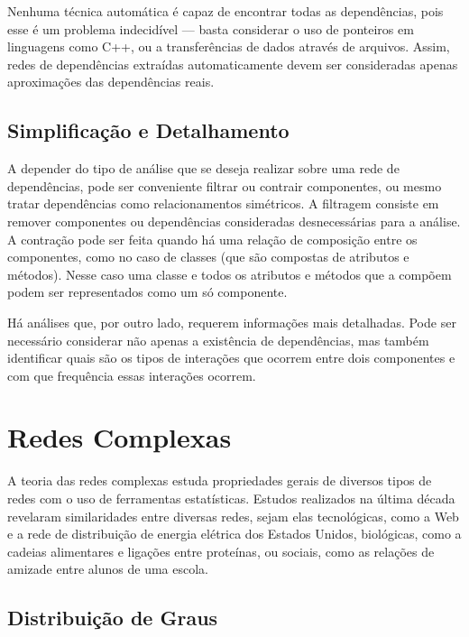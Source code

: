 \documentclass{article}
\begin{document}
Nenhuma técnica automática é capaz de encontrar todas as dependências, pois esse é um problema indecidível \cite{Landi1992} --- basta considerar o uso de ponteiros em linguagens como C++, ou a transferências de dados através de arquivos. Assim, redes de dependências extraídas automaticamente devem ser consideradas apenas aproximações das dependências reais.

\subsection{Simplificação e Detalhamento}

A depender do tipo de análise que se deseja realizar sobre uma rede de dependências, pode ser conveniente filtrar ou contrair componentes, ou mesmo tratar dependências como relacionamentos simétricos. A filtragem consiste em remover componentes ou dependências consideradas desnecessárias para a análise. A contração pode ser feita quando há uma relação de composição entre os componentes, como no caso de classes (que são compostas de atributos e métodos). Nesse caso uma classe e todos os atributos e métodos que a compõem podem ser representados como um só componente. %

Há análises que, por outro lado, requerem informações mais detalhadas. Pode ser necessário considerar não apenas a existência de dependências, mas também identificar quais são os tipos de interações que ocorrem entre dois componentes e com que frequência essas interações ocorrem.

\section{Redes Complexas}

A teoria das redes complexas estuda propriedades gerais de diversos tipos de redes com o uso de ferramentas estatísticas. Estudos realizados na última década revelaram similaridades entre diversas redes, sejam elas tecnológicas, como a Web e a rede de distribuição de energia elétrica dos Estados Unidos, biológicas, como a cadeias alimentares e ligações entre proteínas, ou sociais, como as relações de amizade entre alunos de uma escola.

\subsection{Distribuição de Graus}
\end{document}

